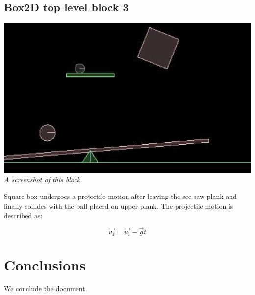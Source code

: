 \documentclass[11pt]{article}
\begin{document}
\subsection{Box2D top level block 3}

\begin{center}
  \includegraphics[scale = 1]{ob3} \\
  \emph{A screenshot of this block} \\
\end{center}

Square box undergoes a projectile motion after leaving the see-saw plank and finally collides with the ball placed on upper plank.
The projectile motion is described as:

\begin{equation}
	\vec{v_1} = \vec{u_1} - \vec{g}t
\end{equation}
\section{Conclusions}
	We conclude the document.



\end{document}
